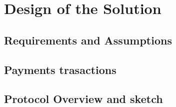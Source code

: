 \section{Design of the Solution}


\subsection{Requirements and Assumptions }


\subsection{Payments trasactions}



\subsection{Protocol Overview and sketch}






